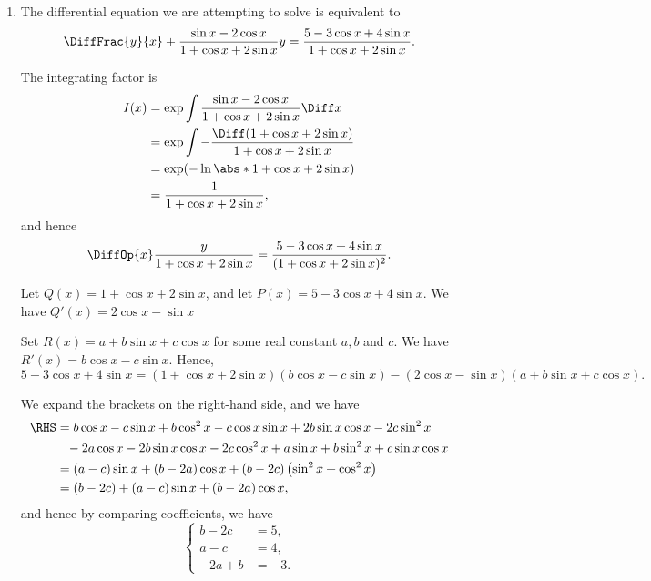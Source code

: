 \begin{enumerate}
    \item The differential equation we are attempting to solve is equivalent to
          \[
              \DiffFrac{y}{x} + \frac{\sin x - 2 \cos x}{1 + \cos x + 2 \sin x} y = \frac{5 - 3 \cos x + 4 \sin x}{1 + \cos x + 2 \sin x}.
          \]

          The integrating factor is
          \begin{align*}
              I(x) & = \exp \int \frac{\sin x - 2 \cos x}{1 + \cos x + 2 \sin x} \Diff x       \\
                   & = \exp \int - \frac{\Diff (1 + \cos x + 2 \sin x)}{1 + \cos x + 2 \sin x} \\
                   & = \exp (- \ln \abs*{1 + \cos x + 2 \sin x})                               \\
                   & = \frac{1}{1 + \cos x + 2 \sin x},
          \end{align*}
          and hence
          \[
              \DiffOp{x} \frac{y}{1 + \cos x + 2 \sin x} = \frac{5 - 3 \cos x + 4 \sin x}{(1 + \cos x + 2 \sin x)^2}.
          \]

          Let \(Q(x) = 1 + \cos x + 2 \sin x\), and let \(P(x) = 5 - 3 \cos x + 4 \sin x\). We have \(Q'(x) = 2 \cos x - \sin x\)

          Set \(R(x) = a + b \sin x + c \cos x\) for some real constant \(a, b\) and \(c\). We have \(R'(x) = b \cos x - c \sin x\). Hence,
          \[
              5 - 3 \cos x + 4 \sin x = (1 + \cos x + 2 \sin x)(b \cos x - c \sin x) - (2 \cos x - \sin x)(a + b \sin x + c \cos x).
          \]

          We expand the brackets on the right-hand side, and we have
          \begin{align*}
              \RHS & = b \cos x - c \sin x + b \cos^2 x - c \cos x \sin x + 2b \sin x \cos x - 2c \sin^2 x             \\
                   & \phantom{=} - 2a \cos x - 2b\sin x \cos x - 2c \cos^2 x + a \sin x + b \sin^2 x + c \sin x \cos x \\
                   & = (a - c) \sin x + (b - 2a) \cos x + (b - 2c) \left(\sin^2 x + \cos^2 x\right)                    \\
                   & = (b - 2c) + (a - c) \sin x + (b - 2a) \cos x,
          \end{align*}
          and hence by comparing coefficients, we have
          \[
              \left\{
              \begin{aligned}
                  b - 2c  & = 5,  \\
                  a - c   & = 4,  \\
                  -2a + b & = -3.
              \end{aligned}
              \right.
          \]


\end{enumerate}
